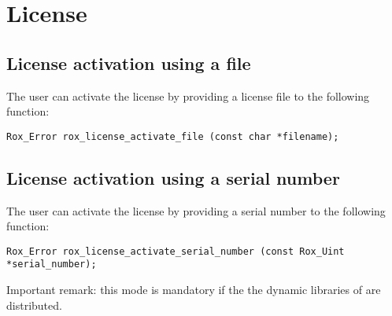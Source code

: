 \section{License}
\label{sec:license}

\subsection{License activation using a file}
\label{sse:license_activation_file}
The user can activate the \rox{} license by providing a license file to the following function:

\begin{lstlisting}
Rox_Error rox_license_activate_file (const char *filename);
\end{lstlisting}

\subsection{License activation using a serial number}
\label{sse:license_activation_serial_number}
The user can activate the \rox{} license by providing a serial number to the following function:

\begin{lstlisting}
Rox_Error rox_license_activate_serial_number (const Rox_Uint *serial_number);
\end{lstlisting}

Important remark: this mode is mandatory if the the dynamic libraries of \rox{} are distributed.
